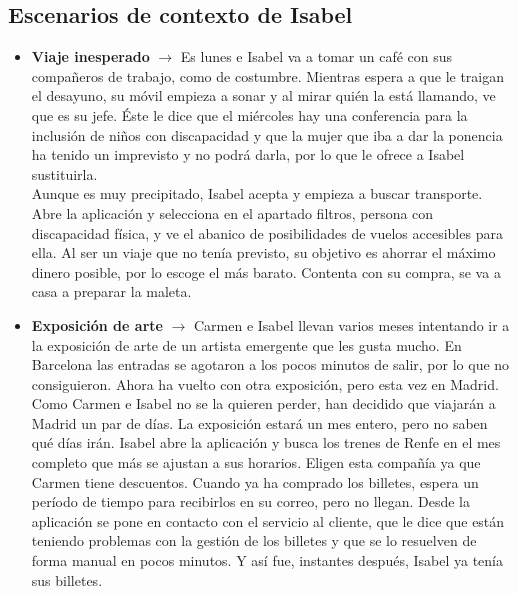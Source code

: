 \subsection{Escenarios de contexto de Isabel}
\begin{itemize}
    \item \textbf{Viaje inesperado} $\rightarrow$ Es lunes e Isabel va a tomar un café con sus compañeros de trabajo, como de costumbre. Mientras espera a 
    que le traigan el desayuno, su móvil empieza a sonar y al mirar quién la está llamando, ve que es su jefe. Éste le dice que el miércoles hay una conferencia 
    para la inclusión de niños con discapacidad y que la mujer que iba a dar la ponencia ha tenido un imprevisto y no podrá darla, por lo que le ofrece a Isabel 
    sustituirla. \\

    Aunque es muy precipitado, Isabel acepta y empieza a buscar transporte. Abre la aplicación y selecciona en el apartado filtros, persona con discapacidad 
    física, y ve el abanico de posibilidades de vuelos accesibles para ella. Al ser un viaje que no tenía previsto, su objetivo es ahorrar el máximo dinero 
    posible, por lo escoge el más barato. Contenta con su compra, se va a casa a preparar la maleta.
    \item \textbf{Exposición de arte} $\rightarrow$ Carmen e Isabel llevan varios meses intentando ir a la exposición de arte de un artista emergente que les 
    gusta mucho. En Barcelona las entradas se agotaron a los pocos minutos de salir, por lo que no consiguieron. Ahora ha vuelto con otra exposición, pero esta 
    vez en Madrid. \\

    Como Carmen e Isabel no se la quieren perder, han decidido que viajarán a Madrid un par de días. La exposición estará un mes entero, pero no saben qué días irán.
    Isabel abre la aplicación y busca los trenes de Renfe en el mes completo que más se ajustan a sus horarios. Eligen esta compañía ya que Carmen tiene 
    descuentos. Cuando ya ha comprado los billetes, espera un período de tiempo para recibirlos en su correo, pero no llegan. Desde la aplicación se pone en contacto 
    con el servicio al cliente, que le dice que están teniendo problemas con la gestión de los billetes y que se lo resuelven de forma manual en pocos minutos. Y así 
    fue, instantes después, Isabel ya tenía sus billetes.
\end{itemize}
